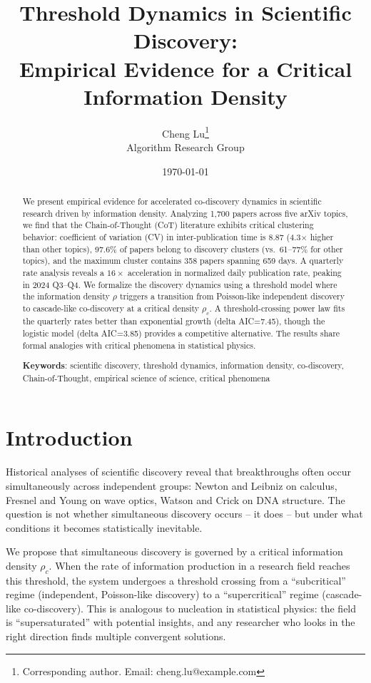 \documentclass[12pt]{article}
\title{Threshold Dynamics in Scientific Discovery:\\
Empirical Evidence for a Critical Information Density}
\author{Cheng Lu\thanks{Corresponding author. Email: cheng.lu@example.com} \\
\small Algorithm Research Group}
\date{\today}
\begin{document}
\maketitle

\begin{abstract}
We present empirical evidence for accelerated co-discovery dynamics in scientific research driven by information density. Analyzing 1,700 papers across five arXiv topics, we find that the Chain-of-Thought (CoT) literature exhibits critical clustering behavior: coefficient of variation (CV) in inter-publication time is 8.87 (4.3$\times$ higher than other topics), 97.6\% of papers belong to discovery clusters (vs.\ 61--77\% for other topics), and the maximum cluster contains 358 papers spanning 659 days. A quarterly rate analysis reveals a $16\times$ acceleration in normalized daily publication rate, peaking in 2024 Q3--Q4. We formalize the discovery dynamics using a threshold model where the information density $\rho$ triggers a transition from Poisson-like independent discovery to cascade-like co-discovery at a critical density $\rho_c$. A threshold-crossing power law fits the quarterly rates better than exponential growth (delta AIC=7.45), though the logistic model (delta AIC=3.85) provides a competitive alternative. The results share formal analogies with critical phenomena in statistical physics.

\textbf{Keywords}: scientific discovery, threshold dynamics, information density, co-discovery, Chain-of-Thought, empirical science of science, critical phenomena
\end{abstract}

\section{Introduction}

Historical analyses of scientific discovery reveal that breakthroughs often occur simultaneously across independent groups: Newton and Leibniz on calculus, Fresnel and Young on wave optics, Watson and Crick on DNA structure. The question is not whether simultaneous discovery occurs -- it does -- but under what conditions it becomes statistically inevitable.

We propose that simultaneous discovery is governed by a critical information density $\rho_c$. When the rate of information production in a research field reaches this threshold, the system undergoes a threshold crossing from a ``subcritical'' regime (independent, Poisson-like discovery) to a ``supercritical'' regime (cascade-like co-discovery). This is analogous to nucleation in statistical physics: the field is ``supersaturated'' with potential insights, and any researcher who looks in the right direction finds multiple convergent solutions.
\end{document}

